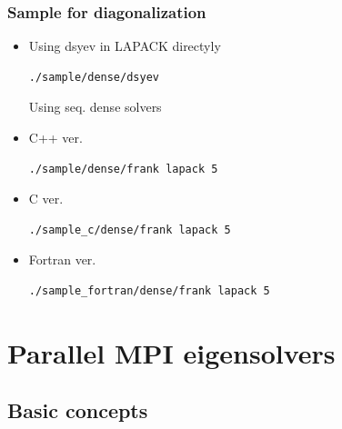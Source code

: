 \begin{frame}[c,fragile]
  \frametitle{Sample for diagonalization}
  \begin{itemize}
  \item Using dsyev in LAPACK directyly 
\begin{lstlisting}[style=shstyle]
./sample/dense/dsyev
\end{lstlisting}
Using seq. dense solvers
  \item C++ ver. 
\begin{lstlisting}[style=shstyle]
./sample/dense/frank lapack 5
\end{lstlisting}
  \item C ver. 
\begin{lstlisting}[style=shstyle]
./sample_c/dense/frank lapack 5
\end{lstlisting}
  \item Fortran ver. 
\begin{lstlisting}[style=shstyle]
./sample_fortran/dense/frank lapack 5
\end{lstlisting}
  \end{itemize}
\end{frame}

\section{Parallel MPI eigensolvers}

\subsection{Basic concepts}

